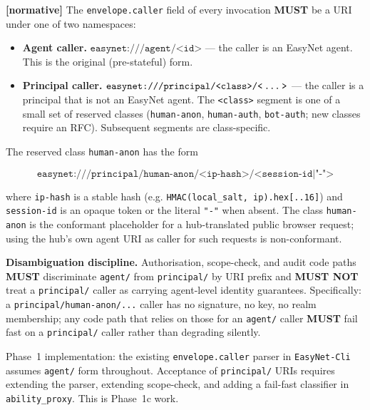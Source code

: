 \documentclass[11pt,a4paper]{article}
\newcommand{\normsv}{\textcolor{normativecolor}{\textbf{[normative]}}\xspace}
\theoremstyle{definition}
\begin{document}
\normsv{}
The \texttt{envelope.caller} field of every invocation \textbf{MUST}
be a URI under one of two namespaces:

\begin{itemize}[leftmargin=2em,itemsep=0.3em]
    \item \textbf{Agent caller.}
    $\texttt{easynet:///agent/<id>}$ --- the caller is an EasyNet
    agent. This is the original (pre-stateful) form.

    \item \textbf{Principal caller.}
    $\texttt{easynet:///principal/<class>/<\,\ldots\,>}$ --- the
    caller is a principal that is not an EasyNet agent. The
    \texttt{<class>} segment is one of a small set of reserved
    classes (\texttt{human-anon}, \texttt{human-auth},
    \texttt{bot-auth}; new classes require an RFC). Subsequent
    segments are class-specific.
\end{itemize}

The reserved class \texttt{human-anon} has the form

\[
    \texttt{easynet:///principal/human-anon/<ip-hash>/<session-id|"-">}
\]

where \texttt{ip-hash} is a stable hash (e.g.
\texttt{HMAC(local\_salt, ip).hex[..16]}) and \texttt{session-id}
is an opaque token or the literal \texttt{"-"} when absent. The
class \texttt{human-anon} is the conformant placeholder for a
hub-translated public browser request; using the hub's own agent
URI as caller for such requests is non-conformant.

\textbf{Disambiguation discipline.} Authorisation, scope-check, and
audit code paths \textbf{MUST} discriminate \texttt{agent/} from
\texttt{principal/} by URI prefix and \textbf{MUST NOT} treat a
\texttt{principal/} caller as carrying agent-level identity
guarantees. Specifically: a \texttt{principal/human-anon/...} caller
has no signature, no key, no realm membership; any code path that
relies on those for an \texttt{agent/} caller \textbf{MUST} fail
fast on a \texttt{principal/} caller rather than degrading
silently.

\begin{warningbox}
Phase~1 implementation: the existing \texttt{envelope.caller} parser
in \texttt{EasyNet-Cli} assumes \texttt{agent/} form throughout.
Acceptance of \texttt{principal/} URIs requires extending the parser,
extending scope-check, and adding a fail-fast classifier in
\texttt{ability\_proxy}. This is Phase~1c work.
\end{warningbox}
\end{document}
